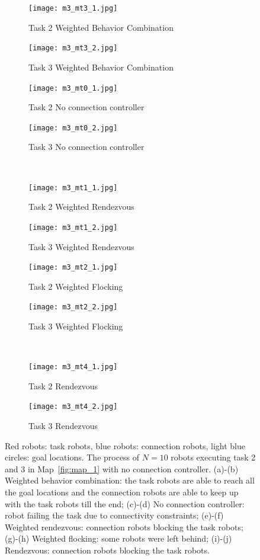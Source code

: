 \documentclass[../main.tex]{subfiles}
\begin{document}
\begin{figure}
\centering
\begin{subfigure}[b]{0.24\textwidth}
\texttt{[image: m3\_mt3\_1.jpg]}
\caption{Task 2 Weighted Behavior Combination}
\label{fig:m3_mt3_1}
\end{subfigure}
\begin{subfigure}[b]{0.24\textwidth}
\texttt{[image: m3\_mt3\_2.jpg]}
\caption{Task 3 Weighted Behavior Combination}
\label{fig:m3_mt3_2}
\end{subfigure} \hfill
\begin{subfigure}[b]{0.24\textwidth}
\texttt{[image: m3\_mt0\_1.jpg]}
\caption{Task 2 No connection controller}
\label{fig:m3_mt0_1}
\end{subfigure}
\begin{subfigure}[b]{0.24\textwidth}
\texttt{[image: m3\_mt0\_2.jpg]}
\caption{Task 3 No connection controller}
\label{fig:m3_mt0_2}
\end{subfigure} \\
\begin{subfigure}[b]{0.24\textwidth}
\texttt{[image: m3\_mt1\_1.jpg]}
\caption{Task 2 Weighted Rendezvous}
\label{fig:m3_mt1_1}
\end{subfigure}
\begin{subfigure}[b]{0.24\textwidth}
\texttt{[image: m3\_mt1\_2.jpg]}
\caption{Task 3 Weighted Rendezvous}
\label{fig:m3_mt1_2}
\end{subfigure} \hfill
\begin{subfigure}[b]{0.24\textwidth}
\texttt{[image: m3\_mt2\_1.jpg]}
\caption{Task 2 Weighted Flocking}
\label{fig:m3_mt2_1}
\end{subfigure}
\begin{subfigure}[b]{0.24\textwidth}
\texttt{[image: m3\_mt2\_2.jpg]}
\caption{Task 3 Weighted Flocking}
\label{fig:m3_mt2_2}
\end{subfigure} \\
\begin{subfigure}[b]{0.24\textwidth}
\texttt{[image: m3\_mt4\_1.jpg]}
\caption{Task 2 Rendezvous}
\label{fig:m3_mt4_1}
\end{subfigure}
\begin{subfigure}[b]{0.24\textwidth}
\texttt{[image: m3\_mt4\_2.jpg]}
\caption{Task 3 Rendezvous}
\label{fig:m3_mt4_2}
\end{subfigure}
\caption{Red robots: task robots, blue robots: connection robots, light blue circles: goal locations. The process of $N=10$ robots executing task 2 and 3 in Map~\ref{fig:map_1} with no connection controller. (a)-(b) Weighted behavior combination: the task robots are able to reach all the goal locations and the connection robots are able to keep up with the task robots till the end; (c)-(d) No connection controller: robot failing the task due to connectivity constraints; (e)-(f) Weighted rendezvous: connection robots blocking the task robots; (g)-(h) Weighted flocking: some robots were left behind; (i)-(j) Rendezvous: connection robots blocking the task robots.}
\label{fig:m3}
\end{figure}
\end{document}
